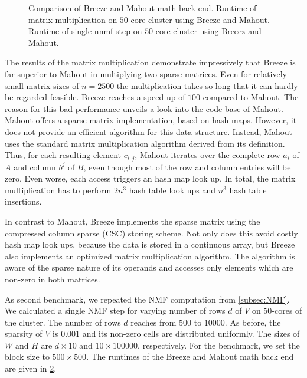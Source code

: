 \begin{figure}
\begin{subfigure}{\dualpgfwidth}
		\caption{}
		\label{subfig:nmfMathBackend}
	\end{subfigure}
	\caption{Comparison of Breeze and Mahout math back end.  Runtime of matrix multiplication on $50$-core cluster using Breeze and Mahout.  Runtime of single nnmf step on $50$-core cluster using Breeez and Mahout.}
	\label{fig:nnmfLoadMathBackend}
\end{figure}

The results of the matrix multiplication demonstrate impressively that Breeze is far superior to Mahout in multiplying two sparse matrices.
Even for relatively small matrix sizes of $n=2500$ the multiplication takes so long that it can hardly be regarded feasible.
Breeze reaches a speed-up of $100$ compared to Mahout.
The reason for this bad performance unveils a look into the code base of Mahout.
Mahout offers a sparse matrix implementation, based on hash maps.
However, it does not provide an efficient algorithm for this data structure.
Instead, Mahout uses the standard matrix multiplication algorithm derived from its definition.
Thus, for each resulting element $c_{i,j}$, Mahout iterates over the complete row $a_i$ of $A$ and column $b^{j}$ of $B$, even though most of the row and column entries will be zero.
Even worse, each access triggers an hash map look up.
In total, the matrix multiplication has to perform $2n^3$ hash table look ups and $n^3$ hash table insertions.

In contrast to Mahout, Breeze implements the sparse matrix using the compressed column sparse (CSC) storing scheme.
Not only does this avoid costly hash map look ups, because the data is stored in a continuous array, but Breeze also implements an optimized matrix multiplication algorithm.
The algorithm is aware of the sparse nature of its operands and accesses only elements which are non-zero in both matrices.

As second benchmark, we repeated the NMF computation from \cref{subsec:NMF}.
We calculated a single NMF step for varying number of rows $d$ of $V$ on $50$-cores of the cluster.
The number of rows $d$ reaches from $500$ to $10000$.
As before, the sparsity of $V$ is $0.001$ and its non-zero cells are distributed uniformly.
The sizes of $W$ and $H$ are $d\times 10$ and $10 \times 100000$, respectively.
For the benchmark, we set the block size to $500 \times 500$.
The runtimes of the Breeze and Mahout math back end are given in \cref{fig:nnmfLoadMathBackend}.

